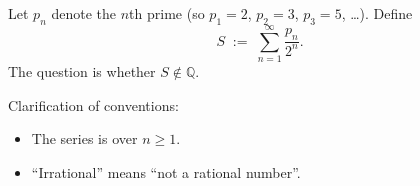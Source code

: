 Let $p_n$ denote the $n$th prime (so $p_1=2$, $p_2=3$, $p_3=5$, \ldots). Define
\[
S \;:=\; \sum_{n=1}^{\infty} \frac{p_n}{2^n}.
\]
The question is whether $S\notin\mathbb{Q}$.

Clarification of conventions:
\begin{itemize}
\item The series is over $n\ge 1$.
\item ``Irrational'' means ``not a rational number''.
\end{itemize}
